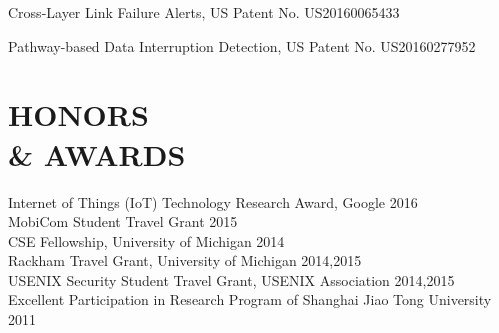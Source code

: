 \documentclass[margin]{res}
\newcommand{\ignore}[1]{}
\begin{document}
\begin{resume}
Cross-Layer Link Failure Alerts, US Patent No. US20160065433 \href{https://www.google.com/patents/US20160065433}{\color{blue}{[Link]}}

Pathway-based Data Interruption Detection, US Patent No. US20160277952 \href{https://www.google.com/patents/US20160277952}{\color{blue}{[Link]}}




\ignore{
\section{RECENT\\ PROJECTS}

\textbf{Characterizing and } \hfill 08/2015-present 
\begin{itemize}
\item[-] Identify native layer interfaces that can be leveraged to access sensitive data or perform privileged operations, including the sysfs filesystem and local sockets.\itemsep -2pt
\item[-] Collect data from latest Android phones and analyze their SEAndroid policies to reveal insecure native interfaces that could be exploited.\itemsep -2pt
\item[-] Reverse engineer customizations made by vendors/carriers that introduce unprotected native interfaces and write exploits.
\end{itemize}

\textbf{Systematically Detecting Inconsistent Security Policy Enforcement in the Android Framework} \hfill 08/2014-08/2015
\begin{itemize}
\item[-] Designed and implemented Kratos, an automated tool that supports systematic detection of inconsistent security policy enforcement within the Android framework. \itemsep -2pt
\item[-] Applied Kratos to various versions of Android, discovered more than 10 zero-day vulnerabilities, and filed bug reports to Google. \itemsep -2pt
\item[-] A paper on this project will appear in NDSS 2016.
\end{itemize}
}


\section{HONORS\\ \& AWARDS}
Internet of Things (IoT) Technology Research Award, Google \hfill 2016\\
MobiCom Student Travel Grant \hfill 2015 \\
CSE Fellowship, University of Michigan \hfill 2014 \\
Rackham Travel Grant, University of Michigan \hfill 2014,2015 \\
USENIX Security Student Travel Grant, USENIX Association \hfill 2014,2015 \\
Excellent Participation in Research Program of Shanghai Jiao Tong University \hfill 2011 \\


\end{resume}
\end{document}
